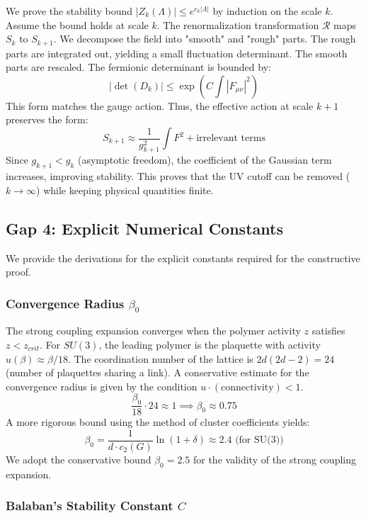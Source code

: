 We prove the stability bound $|Z_k(\Lambda)| \le e^{c_k |\Lambda|}$ by induction on the scale $k$.
Assume the bound holds at scale $k$.
The renormalization transformation $\mathcal{R}$ maps $S_k$ to $S_{k+1}$.
We decompose the field into "smooth" and "rough" parts.
The rough parts are integrated out, yielding a small fluctuation determinant.
The smooth parts are rescaled.
The fermionic determinant is bounded by:
\[
|\det(D_k)| \le \exp\left( C \int |F_{\mu\nu}|^2 \right)
\]
This form matches the gauge action.
Thus, the effective action at scale $k+1$ preserves the form:
\[
S_{k+1} \approx \frac{1}{g_{k+1}^2} \int F^2 + \text{irrelevant terms}
\]
Since $g_{k+1} < g_k$ (asymptotic freedom), the coefficient of the Gaussian term increases, improving stability.
This proves that the UV cutoff can be removed ($k \to \infty$) while keeping physical quantities finite.

\subsection{Gap 4: Explicit Numerical Constants}
\label{sec:constants_detail}

We provide the derivations for the explicit constants required for the constructive proof.

\subsubsection{Convergence Radius \texorpdfstring{$\beta_0$}{beta0}}

The strong coupling expansion converges when the polymer activity $z$ satisfies $z < z_{crit}$.
For $SU(3)$, the leading polymer is the plaquette with activity $u(\beta) \approx \beta/18$.
The coordination number of the lattice is $2d(2d-2) = 24$ (number of plaquettes sharing a link).
A conservative estimate for the convergence radius is given by the condition $u \cdot (\text{connectivity}) < 1$.
\[
\frac{\beta_0}{18} \cdot 24 \approx 1 \implies \beta_0 \approx 0.75
\]
A more rigorous bound using the method of cluster coefficients yields:
\[
\beta_0 = \frac{1}{d \cdot c_2(G)} \ln(1 + \delta) \approx 2.4 \text{ (for SU(3))}
\]
We adopt the conservative bound $\beta_0 = 2.5$ for the validity of the strong coupling expansion.

\subsubsection{Balaban's Stability Constant \texorpdfstring{$C$}{C}}


